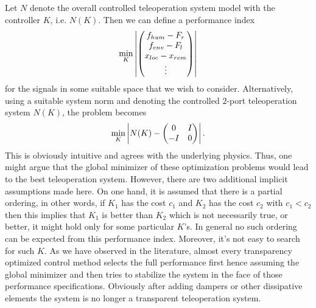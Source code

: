 Let $N$ denote the overall controlled teleoperation system model with the controller $K$, i.e. $N(K)$. Then we can 
define a performance index
\[
\min_K \displaystyle \left|\begin{pmatrix}f_{hum}-F_{r}\\f_{env}-F_{l}\\x_{loc}-x_{rem}\\\vdots\end{pmatrix}\right| 
\]
for the signals in some suitable space that we wish to consider. Alternatively, using a suitable system norm and 
denoting the controlled $2$-port teleoperation system $N(K)$, the problem becomes
\[
\min_K \displaystyle \left|N(K) - \begin{pmatrix}0&I\\-I&0\end{pmatrix}\right|.
\]
This is obviously intuitive and agrees with the underlying physics. Thus, one might argue that the global minimizer
of these optimization problems would lead to the best teleoperation system. However, there are two additional implicit 
assumptions made here. On one hand, it is assumed that there is a partial ordering, in other words, if $K_1$ has the cost 
$c_1$ and $K_2$ has the cost $c_2$ with $c_1<c_2$ then this implies that $K_1$ is better than $K_2$ which is not 
necessarily true, or better, it might hold only for some particular $K$'s. In general no such ordering can be expected from 
this performance index. Moreover, it's not easy to search for such $K$. As we have observed in the literature, almost every transparency optimized
control method selects the full performance first hence assuming the global minimizer and then tries to stabilize the system 
in the face of those performance specifications. Obviously after adding dampers or other dissipative elements the system 
is no longer a transparent teleoperation system. 

